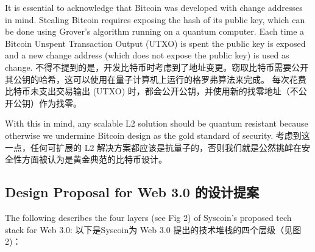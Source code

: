\documentclass{ctexart}
\begin{document}
It is essential to acknowledge that Bitcoin was developed with change addresses in mind. Stealing Bitcoin requires exposing the hash of its public key, which can be done using Grover’s algorithm running on a quantum computer. Each time a Bitcoin Unspent Transaction Output (UTXO) is spent the public key is exposed and a new change address (which does not expose the public key) is used as change. 不得不提到的是，开发比特币时考虑到了地址变更。窃取比特币需要公开其公钥的哈希，这可以使用在量子计算机上运行的格罗弗算法来完成。 每次花费比特币未支出交易输出 (UTXO) 时，都会公开公钥，并使用新的找零地址（不公开公钥）作为找零。

With this in mind, any scalable L2 solution should be quantum resistant because otherwise we undermine Bitcoin design as the gold standard of security. 考虑到这一点，任何可扩展的 L2 解决方案都应该是抗量子的，否则我们就是公然挑衅在安全性方面被认为是黄金典范的比特币设计。

\subsection{Design Proposal for Web 3.0 的设计提案}

The following describes the four layers (see Fig 2) of Syscoin’s proposed tech stack for Web 3.0:
以下是Syscoin为 Web 3.0 提出的技术堆栈的四个层级（见图 2)：
\end{document}
